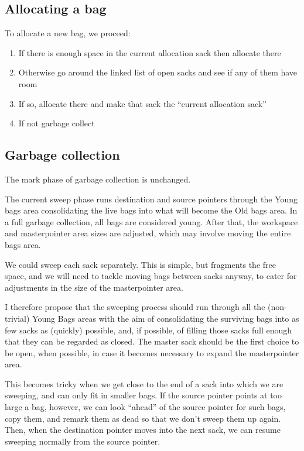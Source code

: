 \documentclass[12pt]{article}
\begin{document}
\subsection{Allocating a bag}

To allocate a new bag, we proceed:
\begin{enumerate}
\item If there is enough space in the current allocation sack then
allocate there
\item Otherwise go around the linked list of open sacks and see if any 
of them have room
\item If so, allocate there and make that sack the ``current
allocation sack''
\item If not garbage collect
\end{enumerate}

\subsection{Garbage collection}

The mark phase of garbage collection is unchanged.

The current sweep phase runs destination and source pointers through
the Young bags area consolidating the live bags into what will become the
Old bags area. In a full garbage collection, all bags are considered
young. After that, the workspace and masterpointer area sizes
are adjusted, which may involve moving the entire bags area. 

We could sweep each sack separately. This is simple, but fragments the 
free space, and we will need to tackle moving bags between sacks
anyway, to cater for adjustments in the size of the masterpointer
area.

I therefore propose that the sweeping process should run through all
the (non-trivial) Young Bags areas with the aim of consolidating the
surviving bags into as few sacks as (quickly) possible, and, if
possible, of filling those sacks full enough that they can be regarded 
as closed. The master sack should be the first choice to be open, when 
possible, in case it becomes necessary to expand the masterpointer area.

This becomes tricky when we get close to the end of a sack into which
we are sweeping, and can only fit in smaller bags. If the source
pointer points at too large a bag, however, we can look ``ahead'' of
the source pointer for such bags, copy them, and remark them as dead
so that we don't sweep them up again. Then, when the destination
pointer moves into the next sack, we can resume sweeping normally from
the source pointer.
\end{document}
